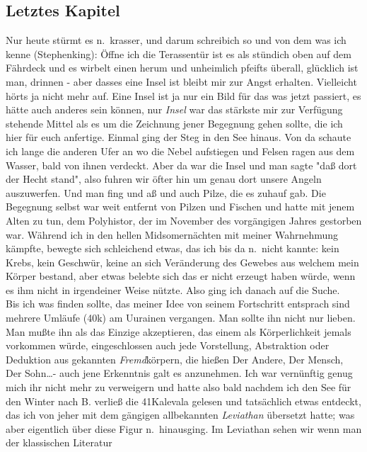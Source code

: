 \documentclass[
]{article}
\author{}
\date{\vspace{-2.5em}}
\begin{document}
\subsection{Letztes Kapitel}\label{letztes-kapitel}

Nur heute stürmt es n.~krasser, und darum schreibich so und von dem was
ich kenne (Stephenking): Öffne ich die Terassentür ist es als stündich
oben auf dem Fährdeck und es wirbelt einen herum und unheimlich pfeifts
überall, glücklich ist man, drinnen - aber dasses eine Insel ist bleibt
mir zur Angst erhalten. Vielleicht hörts ja nicht mehr auf. Eine Insel
ist ja nur ein Bild für das was jetzt passiert, es hätte auch anderes
sein können, nur \emph{Insel} war das stärkste mir zur Verfügung
stehende Mittel als es um die Zeichnung jener Begegnung gehen sollte,
die ich hier für euch anfertige. Einmal ging der Steg in den See hinaus.
Von da schaute ich lange die anderen Ufer an wo die Nebel aufstiegen und
Felsen ragen aus dem Wasser, bald von ihnen verdeckt. Aber da war die
Insel und man sagte "daß dort der Hecht stand", also fuhren wir öfter
hin um genau dort unsere Angeln auszuwerfen. Und man fing und aß und
auch Pilze, die es zuhauf gab. Die Begegnung selbst war weit entfernt
von Pilzen und Fischen und hatte mit jenem Alten zu tun, dem Polyhistor,
der im November des vorgängigen Jahres gestorben war. Während ich in den
hellen Midsomernächten mit meiner Wahrnehmung kämpfte, bewegte sich
schleichend etwas, das ich bis da n.~nicht kannte: kein Krebs, kein
Geschwür, keine an sich Veränderung des Gewebes aus welchem mein Körper
bestand, aber etwas belebte sich das er nicht erzeugt haben würde, wenn
es ihm nicht in irgendeiner Weise nützte. Also ging ich danach auf die
Suche.\\
Bis ich was finden sollte, das meiner Idee von seinem Fortschritt
entsprach sind mehrere Umläufe (40k) am Uurainen vergangen. Man sollte
ihn nicht nur lieben. Man mußte ihn als das Einzige akzeptieren, das
einem als Körperlichkeit jemals vorkommen würde, eingeschlossen auch
jede Vorstellung, Abstraktion oder Deduktion aus gekannten
\emph{Fremd}körpern, die hießen Der Andere, Der Mensch, Der Sohn\ldots-
auch jene Erkenntnis galt es anzunehmen. Ich war vernünftig genug mich
ihr nicht mehr zu verweigern und hatte also bald nachdem ich den See für
den Winter nach B. verließ die 41Kalevala gelesen und tatsächlich etwas
entdeckt, das ich von jeher mit dem gängigen allbekannten
\emph{Leviathan} übersetzt hatte; was aber eigentlich über diese Figur
n.~hinausging. Im Leviathan sehen wir wenn man der klassischen Literatur
\end{document}
